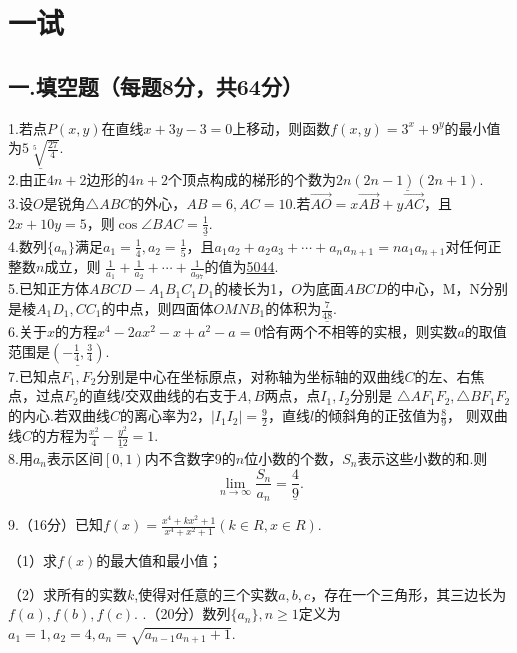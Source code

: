 \section*{一试}
\subsection*{一.填空题（每题8分，共64分）}
1.若点$P(x,y)$在直线$x+3y-3=0$上移动，则函数$f(x,y)=3^x+9^y$的最小值为$\underline{5\sqrt[5]{\frac{27}{4}}}$.
~\\

2.由正$4n+2$边形的$4n+2$个顶点构成的梯形的个数为$\underline{2n(2n-1)(2n+1)}$.
~\\

3.设$O$是锐角$\bigtriangleup ABC$的外心，$AB=6,AC=10$.若$\overrightarrow{AO}=x\overrightarrow{AB}+y\overrightarrow{AC}$，且$2x+10y=5$，则$\cos{\angle BAC}=\underline{\frac{1}{3}}$.
~\\

4.数列$\{a_n \}$满足$a_1=\frac{1}{4},a_2=\frac{1}{5}$，且$a_1a_2+a_2a_3+\cdots+a_na_{n+1}=na_1a_{n+1}$对任何正整数$n$成立，则
$\frac{1}{a_1}+\frac{1}{a_2}+\cdots+\frac{1}{a_{97}}$的值为\underline{5044}.
~\\

5.已知正方体$ABCD-A_1B_1C_1D_1$的棱长为1，$O$为底面$ABCD$的中心，M，N分别是棱$A_1D_1,CC_1$的中点，则四面体$OMNB_1$的体积为$\underline{\frac{7}{48}}$.
~\\

6.关于$x$的方程$x^4-2ax^2-x+a^2-a=0$恰有两个不相等的实根，则实数$a$的取值范围是$\underline{(-\frac{1}{4},\frac{3}{4})}$.
~\\

7.已知点$F_1,F_2$分别是中心在坐标原点，对称轴为坐标轴的双曲线$C$的左、右焦点，过点$F_2$的直线$l$交双曲线的右支于$A,B$两点，点$I_1,I_2$分别是
$\bigtriangleup AF_1F_2,\bigtriangleup BF_1F_2$的内心.若双曲线$C$的离心率为2，$|I_1I_2|=\frac{9}{2}$，直线$l$的倾斜角的正弦值为$\frac{8}{9}$，
则双曲线$C$的方程为$\underline{\frac{x^2}{4}-\frac{y^2}{12}=1}$.
~\\

8.用$a_n$表示区间$\left[ 0,1 \right)$内不含数字9的$n$位小数的个数，$S_n$表示这些小数的和.则
$$\lim_{n\to \infty}\frac{S_n}{a_n}=\underline{\frac{4}{9}}.$$


9.（16分）已知$f(x)=\frac{x^4+kx^2+1}{x^4+x^2+1}(k\in R,x\in R)$.

（1）求$f(x)$的最大值和最小值；

（2）求所有的实数$k$,使得对任意的三个实数$a,b,c$，存在一个三角形，其三边长为$f(a),f(b),f(c)$.
.（20分）数列$\{a_n\},n\geq 1$定义为$a_1=1,a_2=4,a_n=\sqrt{a_{n-1}a_{n+1}+1}$.

